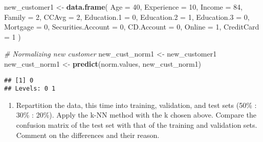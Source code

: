 \documentclass[
]{article}
\newenvironment{Shaded}{\begin{snugshade}}{\end{snugshade}}
\newcommand{\AttributeTok}[1]{\textcolor[rgb]{0.13,0.29,0.53}{#1}}
\newcommand{\CommentTok}[1]{\textcolor[rgb]{0.56,0.35,0.01}{\textit{#1}}}
\newcommand{\DecValTok}[1]{\textcolor[rgb]{0.00,0.00,0.81}{#1}}
\newcommand{\FunctionTok}[1]{\textcolor[rgb]{0.13,0.29,0.53}{\textbf{#1}}}
\newcommand{\NormalTok}[1]{#1}
\newcommand{\OtherTok}[1]{\textcolor[rgb]{0.56,0.35,0.01}{#1}}
\newcommand{\SpecialCharTok}[1]{\textcolor[rgb]{0.81,0.36,0.00}{\textbf{#1}}}
\providecommand{\tightlist}{%
  \setlength{\itemsep}{0pt}\setlength{\parskip}{0pt}}
\begin{document}
\begin{Shaded}
\begin{Highlighting}[]
\NormalTok{new\_customer1 }\OtherTok{\textless{}{-}} \FunctionTok{data.frame}\NormalTok{(}
  \AttributeTok{Age =} \DecValTok{40}\NormalTok{,}
  \AttributeTok{Experience =} \DecValTok{10}\NormalTok{,}
  \AttributeTok{Income =} \DecValTok{84}\NormalTok{,}
  \AttributeTok{Family =} \DecValTok{2}\NormalTok{,}
  \AttributeTok{CCAvg =} \DecValTok{2}\NormalTok{,}
  \AttributeTok{Education.1 =} \DecValTok{0}\NormalTok{,}
  \AttributeTok{Education.2 =} \DecValTok{1}\NormalTok{,}
  \AttributeTok{Education.3 =} \DecValTok{0}\NormalTok{,}
  \AttributeTok{Mortgage =} \DecValTok{0}\NormalTok{,}
  \AttributeTok{Securities.Account =} \DecValTok{0}\NormalTok{,}
  \AttributeTok{CD.Account =} \DecValTok{0}\NormalTok{,}
  \AttributeTok{Online =} \DecValTok{1}\NormalTok{,}
  \AttributeTok{CreditCard =} \DecValTok{1}
\NormalTok{)}

\CommentTok{\# Normalizing new customer}
\NormalTok{new\_cust\_norm1 }\OtherTok{\textless{}{-}}\NormalTok{ new\_customer1}
\NormalTok{new\_cust\_norm1 }\OtherTok{\textless{}{-}} \FunctionTok{predict}\NormalTok{(norm.values, new\_cust\_norm1)}
\end{Highlighting}
\end{Shaded}

\begin{Shaded}
\end{Shaded}

\begin{verbatim}
## [1] 0
## Levels: 0 1
\end{verbatim}

\begin{enumerate}
\def\labelenumi{\arabic{enumi}.}
\setcounter{enumi}{4}
\tightlist
\item
  Repartition the data, this time into training, validation, and test
  sets (50\% : 30\% : 20\%). Apply the k-NN method with the k chosen
  above. Compare the confusion matrix of the test set with that of the
  training and validation sets. Comment on the differences and their
  reason.
\end{enumerate}
\end{document}
